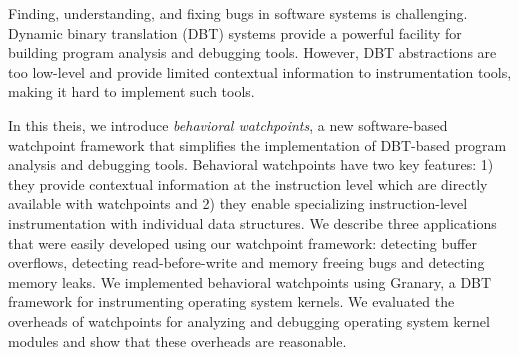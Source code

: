 Finding, understanding, and fixing bugs in software systems is challenging. Dynamic binary translation (DBT) systems provide a powerful facility for building program analysis and debugging tools. However, DBT abstractions are too low-level and provide limited contextual information to instrumentation tools, making it hard to implement such tools.

In this theis, we introduce \emph{behavioral watchpoints}, a new software-based watchpoint framework that simplifies the implementation of DBT-based program analysis and debugging tools. Behavioral watchpoints have two key features: 1) they provide contextual information at the instruction level which are directly available with watchpoints and 2) they enable specializing instruction-level instrumentation with individual data structures. We describe three applications that were easily developed using our watchpoint framework: detecting buffer overflows, detecting read-before-write and memory freeing bugs and detecting memory leaks. We implemented behavioral watchpoints using Granary, a DBT framework for instrumenting operating system kernels. We evaluated the overheads of watchpoints for analyzing and debugging operating system kernel modules and show that these overheads are reasonable.

